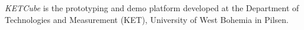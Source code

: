 {\it KETCube} \cite{ZCU:KETCube:05-2018} is the prototyping and demo platform developed at the Department of Technologies and Measurement (KET), University of West Bohemia in Pilsen. 
